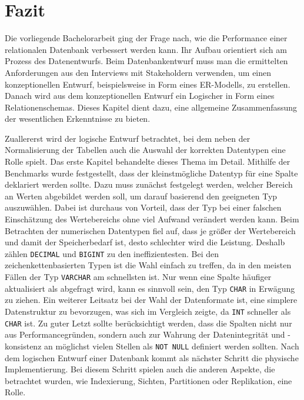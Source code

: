 \chapter{Fazit}\label{ch:fazit}

Die vorliegende Bachelorarbeit ging der Frage nach, wie die Performance einer relationalen Datenbank verbessert werden kann.
Ihr Aufbau orientiert sich am Prozess des Datenentwurfs.
Beim Datenbankentwurf muss man die ermittelten Anforderungen aus den Interviews mit Stakeholdern verwenden, um einen konzeptionellen Entwurf, beispielsweise in Form eines ER-Modells, zu erstellen.
Danach wird aus dem konzeptionellen Entwurf ein Logischer in Form eines Relationenschemas.
Dieses Kapitel dient dazu, eine allgemeine Zusammenfassung der wesentlichen Erkenntnisse zu bieten.

Zuallererst wird der logische Entwurf betrachtet, bei dem neben der Normalisierung der Tabellen auch die Auswahl der korrekten Datentypen eine Rolle spielt.
Das erste Kapitel behandelte dieses Thema im Detail.
Mithilfe der Benchmarks wurde festgestellt, dass der kleinstmögliche Datentyp für eine Spalte deklariert werden sollte.
Dazu muss zunächst festgelegt werden, welcher Bereich an Werten abgebildet werden soll, um darauf basierend den geeigneten Typ auszuwählen.
Dabei ist durchaus von Vorteil, dass der Typ bei einer falschen Einschätzung des Wertebereichs ohne viel Aufwand verändert werden kann.
Beim Betrachten der numerischen Datentypen fiel auf, dass je größer der Wertebereich und damit der Speicherbedarf ist, desto schlechter wird die Leistung.
Deshalb zählen \texttt{DECIMAL} und \texttt{BIGINT} zu den ineffizientesten.
Bei den zeichenkettenbasierten Typen ist die Wahl einfach zu treffen, da in den meisten Fällen der Typ \texttt{VARCHAR} am schnellsten ist.
Nur wenn eine Spalte häufiger aktualisiert als abgefragt wird, kann es sinnvoll sein, den Typ \texttt{CHAR} in Erwägung zu ziehen.
Ein weiterer Leitsatz bei der Wahl der Datenformate ist, eine simplere Datenstruktur zu bevorzugen, was sich im Vergleich zeigte, da \texttt{INT} schneller als \texttt{CHAR} ist.
Zu guter Letzt sollte berücksichtigt werden, dass die Spalten nicht nur aus Performancegründen, sondern auch zur Wahrung der Datenintegrität und -konsistenz an möglichst vielen Stellen als \texttt{NOT NULL} definiert werden sollten.
Nach dem logischen Entwurf einer Datenbank kommt als nächster Schritt die physische Implementierung.
Bei diesem Schritt spielen auch die anderen Aspekte, die betrachtet wurden, wie Indexierung, Sichten, Partitionen oder Replikation, eine Rolle.

